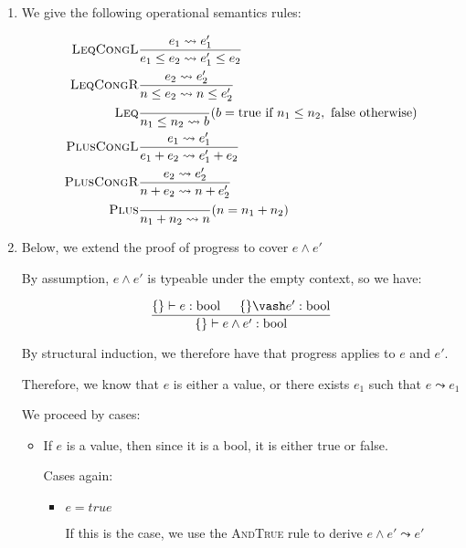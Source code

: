 


\begin{enumerate}
  \item

    We give the following operational semantics rules:

    \begin{align*}
      \textsc{LeqCongL}&\frac{e_1 \leadsto e_1'}{e_1 \leq e_2 \leadsto e_1' \leq e_2}\\
      \textsc{LeqCongR}&\frac{e_2 \leadsto e_2'}{n \leq e_2 \leadsto n \leq e_2'}\\
      \textsc{Leq}&\frac{}{n_1 \leq n_2 \leadsto b}(b = \text{true if }n_1 \leq n_2, \text{ false otherwise})\\
      \textsc{PlusCongL}&\frac{e_1 \leadsto e_1'}{e_1 + e_2 \leadsto e_1' + e_2}\\
      \textsc{PlusCongR}&\frac{e_2 \leadsto e_2'}{n + e_2 \leadsto n + e_2'}\\
      \textsc{Plus}&\frac{}{n_1 + n_2 \leadsto n}(n = n_1 + n_2)\\
    \end{align*}

  \item
    Below, we extend the proof of progress to cover $e \wedge e'$

    By assumption, $e \wedge e'$ is typeable under the empty context, so we have:

    \[
     \frac{\{\} \vdash e : \text{bool} \hspace{15pt} \{\} \vash e' : \text{bool}}{\{\} \vdash e \wedge e' : \text{bool}}\\
    \]

    By structural induction, we therefore have that progress applies to $e$ and $e'$.

    Therefore, we know that $e$ is either a value, or there exists $e_1$ such that $e \leadsto e_1$

    We proceed by cases:

    \begin{itemize}
      \item
        If $e$ is a value, then since it is a bool, it is either true or false.

        Cases again:

        \begin{itemize}
          \item
            $e = true$

            If this is the case, we use the \textsc{AndTrue} rule to derive $e \wedge e' \leadsto e'$


\end{itemize}
\end{itemize}
\end{enumerate}
